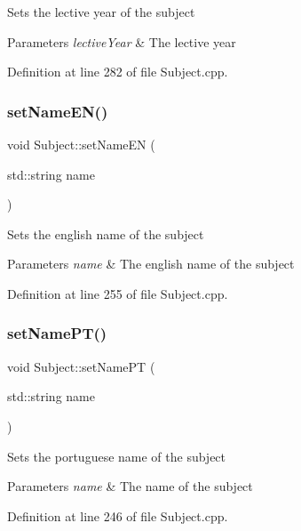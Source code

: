 Sets the lective year of the subject 
\begin{DoxyParams}{Parameters}
{\em lective\+Year} & The lective year \\
\hline
\end{DoxyParams}


Definition at line 282 of file Subject.\+cpp.

\mbox{\label{classSubject_af9e9958808eccfa4afaf702f560b0e6d}} 
\subsubsection{\texorpdfstring{set\+Name\+E\+N()}{setNameEN()}}
{\footnotesize\ttfamily void Subject\+::set\+Name\+EN (\begin{DoxyParamCaption}\item[{std\+::string}]{name }\end{DoxyParamCaption})}

Sets the english name of the subject 
\begin{DoxyParams}{Parameters}
{\em name} & The english name of the subject \\
\hline
\end{DoxyParams}


Definition at line 255 of file Subject.\+cpp.

\mbox{\label{classSubject_afbae90dc81a1ceb1f5ccf0099639e265}} 
\subsubsection{\texorpdfstring{set\+Name\+P\+T()}{setNamePT()}}
{\footnotesize\ttfamily void Subject\+::set\+Name\+PT (\begin{DoxyParamCaption}\item[{std\+::string}]{name }\end{DoxyParamCaption})}

Sets the portuguese name of the subject 
\begin{DoxyParams}{Parameters}
{\em name} & The name of the subject \\
\hline
\end{DoxyParams}


Definition at line 246 of file Subject.\+cpp.


